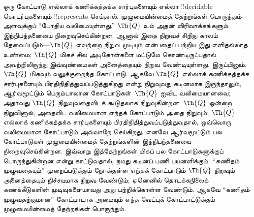 \documentclass[../../../include/open-logic-section]{subfiles}
\begin{document}
ஒரு கோட்பாடு எல்லாக் கணிக்கத்தக்க சார்புகளையும் எல்லா !!{decidable}
தொடர்புகளையும் !!{represents} செய்தால், முழுமையின்மைத் தேற்றங்கள்
பொருந்தும் அளவுக்குப் ``போதிய வலிமையுள்ளது.'' $\Th{Q}$ உம் அதன்
விரிவாக்கங்களும் இந்நிபந்தனையை நிறைவுசெய்கின்றன. ஆனால் இதை நிறுவச் சிறிது
காலம் தேவைப்படும்---$\Th{Q}$ எவற்றை நிறுவ முடியும் என்பதைப் பற்றிய இது
எளிதல்லாத உண்மை; $\Th{Q}$ மிகச் சில அடிகோள்களை மட்டுமே கொண்டிருப்பதால்
அவற்றிலிருந்து இவ்வுண்மைகள் அனைத்தையும் நிறுவ வேண்டியுள்ளது. இருப்பினும், $\Th{Q}$
மிகவும் வலுக்குறைந்த கோட்பாடு. ஆகவே $\Th{Q}$ எல்லாக் கணிக்கத்தக்க
சார்புகளையும் பிரதிநிதித்துவப்படுத்துகிறது என்று நிறுவுவது கடினமாக இருந்தாலும்,
ஆர்வமூட்டும் பெரும்பாலான கோட்பாடுகள்~$\Th{Q}$ ஐவிட வலிமையானவை; அதாவது
$\Th{Q}$ நிறுவுவதைவிடக் கூடுதலாக நிறுவுகின்றன. $\Th{Q}$ ஒன்றை நிறுவினால்,
அதைவிட வலிமையான எந்தக் கோட்பாடும் அதை நிறுவும்; $\Th{Q}$ எல்லாக்
கணிக்கத்தக்க சார்புகளையும் பிரதிநிதித்துவப்படுத்துவதால், ஒவ்வொரு வலிமையான
கோட்பாடும் அவ்வாறே செய்கிறது. எனவே ஆர்வமூட்டும் பல கோட்பாடுகள்
முழுமையின்மைத் தேற்றங்களின் இந்நிபந்தனையை நிறைவுசெய்கின்றன. இவ்வாறு
இத்தேற்றங்கள் மிகப் பல கோட்பாடுகளுக்குப் பொருந்துகின்றன என்று காட்டுவதால்,
நமது கடினப் பணி பயனளிக்கும். ``கணிதம் முழுவதையும்'' முறைப்படுத்தும் நோக்குள்ள
எந்தக் கோட்பாடும் $\Th{Q}$ நிறுவும் அனைத்தையும் நிச்சயமாக நிறுவ வேண்டும்;
ஏனெனில் தொடக்கநிலைக் கணக்கீடுகளின் முடிவுகளையாவது அது பற்றிக்கொள்ள வேண்டும்.
ஆகவே ``கணிதம் முழுவதற்குமான'' கோட்பாடாக அமையும் எந்த வேட்புக் கோட்பாட்டுக்கும்
முழுமையின்மைத் தேற்றங்கள் பொருந்தும்.
\end{document}
